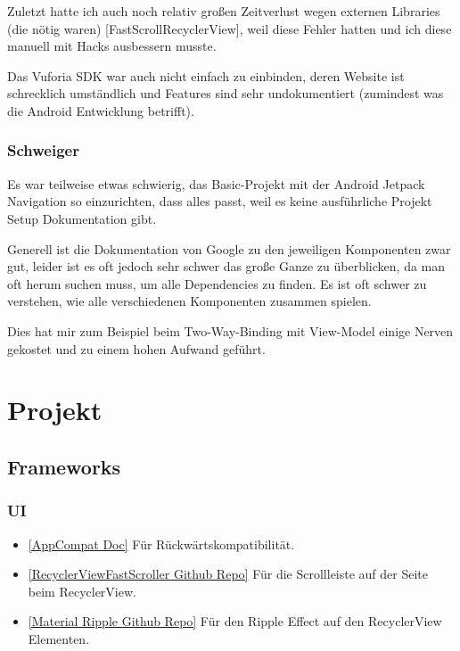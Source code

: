 \documentclass{mrtrash}
\begin{document}
Zuletzt hatte ich auch noch relativ großen Zeitverlust wegen externen Libraries (die nötig waren) [FastScrollRecyclerView], weil diese Fehler hatten und ich diese manuell mit Hacks ausbessern musste.

Das Vuforia SDK war auch nicht einfach zu einbinden, deren Website ist schrecklich umständlich und Features sind sehr undokumentiert (zumindest was die Android Entwicklung betrifft).

\subsection{Schweiger}

Es war teilweise etwas schwierig, das Basic-Projekt mit der Android Jetpack Navigation so einzurichten, dass alles passt, weil es keine ausführliche Projekt Setup Dokumentation gibt.

Generell ist die Dokumentation von Google zu den jeweiligen Komponenten zwar gut, leider ist es oft jedoch sehr schwer das große Ganze zu überblicken, da man oft herum suchen muss, um alle Dependencies zu finden. Es ist oft schwer zu verstehen, wie alle verschiedenen Komponenten zusammen spielen.

Dies hat mir zum Beispiel beim Two-Way-Binding mit View-Model einige Nerven gekostet und zu einem hohen Aufwand geführt.

\chapter{Projekt}

\section{Frameworks}

\subsection{UI}
\begin{itemize}
    \item \href{https://developer.android.com/jetpack/androidx/releases/appcompat}{[AppCompat Doc]} Für Rückwärtskompatibilität.
    \item \href{https://github.com/danoz73/RecyclerViewFastScroller}{[RecyclerViewFastScroller Github Repo]} Für die Scrollleiste auf der Seite beim RecyclerView.
    \item \href{https://github.com/balysv/material-ripple}{[Material Ripple Github Repo]} Für den Ripple Effect auf den RecyclerView Elementen.
\end{itemize}
\end{document}
